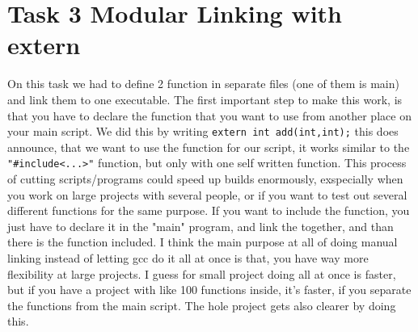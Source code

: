 \documentclass{article}
\begin{document}
\singlespacing

\section{Task 3 Modular Linking with extern}

On this task we had to define 2 function in separate files (one of them is main) and link them to one executable. The first important step to make this work, is that you have to declare the function that you want to use from another place on your main script. We did this by writing \verb!extern int add(int,int);! this does announce, that we want to use the function for our script, it works similar to the \verb!"#include<...>"! function, but only with one self written function. This process of cutting scripts/programs could speed up builds enormously, exspecially when you work on large projects with several people, or if you want to test out several different functions for the same purpose. If you want to include the function, you just have to declare it in the "main" program, and link the together, and than there is the function included. I think the main purpose at all of doing manual linking instead of letting gcc do it all at once is that, you have way more flexibility at large projects. I guess for small project doing all at once is faster, but if you have a project with like 100 functions inside, it's faster, if you separate the functions from the main script. The hole project gets also clearer by doing this. 
\end{document}
